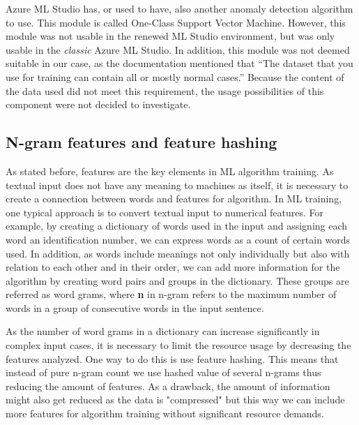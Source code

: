 Azure ML Studio has,
or used to have,
also another anomaly detection algorithm to use.
This module is called One-Class Support Vector Machine.
However,
this module was not usable in the renewed ML Studio environment,
but was only usable in the \textit{classic} Azure ML Studio.
In addition,
this module was not deemed suitable in our case,
as the documentation mentioned that
\enquote{The dataset that you use for training
can contain all or mostly normal cases.}
Because the content of the data used did not meet this requirement,
the usage possibilities of this component were not decided to investigate.~\cite{azure2021oneclasssvm}


\subsection{N-gram features and feature hashing}\label{subsec:bg-ngram-features-and-hashing}

As stated before, %
features are the key elements in ML algorithm training.
As textual input does not have any meaning to machines as itself,
it is necessary to create a connection between words and features for algorithm.
In ML training, one typical approach is to convert textual input to numerical features.
For example, by creating a dictionary of words used in the input
and assigning each word an identification number,
we can express words as a count of certain words used.
In addition,
as words include meanings not only individually but also
with relation to each other and in their order, %
we can add more information for the algorithm
by creating word pairs and groups in the dictionary.
These groups are referred as word grams,
where \textbf{n} in n-gram refers to the maximum number of words
in a group of consecutive words in the input sentence.



As the number of word grams in a dictionary can increase significantly
in complex input cases,
it is necessary to limit the resource usage by decreasing the features analyzed.
One way to do this is use feature hashing.
This means that instead of pure n-gram count
we use hashed value of several n-grams
thus reducing the amount of features.
As a drawback,
the amount of information might also get reduced as the data is "compressed"
but this way we can include more features for algorithm training
without significant resource demands.

